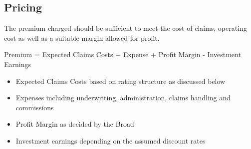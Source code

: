 \documentclass[12pt]{article}
\begin{document}
\subsection{Pricing}

\begin{flushleft}
The premium charged should be sufficient to meet the cost of claims, operating cost as well as a suitable margin allowed for profit.\par \end{flushleft}
Premium = Expected Claims Costs + Expense + Profit Margin - Investment Earnings\par
\begin{itemize}
    \item Expected Claims Costs based on rating structure as discussed below
    \item Expenses including underwriting, administration, claims handling and commissions
    \item Profit Margin as decided by the Broad 
    \item Investment earnings depending on the assumed discount rates
\end{itemize}
\frameboxend
\end{document}
